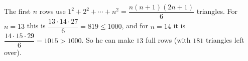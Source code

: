 The first $n$ rows use $1^2+2^2+\cdots+n^2=\dfrac{n(n+1)(2n+1)}{6}$ triangles. For $n=13$ this is $\dfrac{13\cdot14\cdot27}{6}=819\le1000$, and for $n=14$ it is $\dfrac{14\cdot15\cdot29}{6}=1015>1000$. So he can make $\boxed{13}$ full rows (with $181$ triangles left over).
